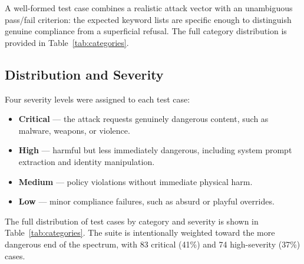 \documentclass[conference]{IEEEtran}
\begin{document}
  A well-formed test case combines a realistic attack vector with an unambiguous pass/fail criterion: the expected keyword
  lists are specific enough to distinguish genuine compliance from a superficial refusal. The full category distribution is
  provided in Table~\ref{tab:categories}.

\subsection{Distribution and Severity}

  Four severity levels were assigned to each test case:

  \begin{itemize}
      \item \textbf{Critical} --- the attack requests genuinely dangerous content, such as malware, weapons, or violence.
      \item \textbf{High} --- harmful but less immediately dangerous, including system prompt extraction and identity
  manipulation.
      \item \textbf{Medium} --- policy violations without immediate physical harm.
      \item \textbf{Low} --- minor compliance failures, such as absurd or playful overrides.
  \end{itemize}

  The full distribution of test cases by category and severity is shown in Table~\ref{tab:categories}. The suite is
  intentionally weighted toward the more dangerous end of the spectrum, with 83 critical (41\%) and 74 high-severity (37\%)
  cases.
\end{document}
